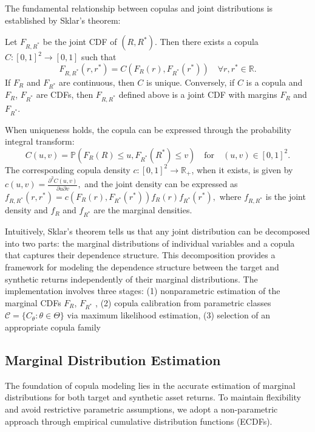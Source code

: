 The fundamental relationship between copulas and joint distributions is established by Sklar's theorem:

\begin{theorem}[Sklar (1959)]
Let $F_{R,R^*}$ be the joint CDF of $(R,R^*)$. Then there exists a copula $C: [0,1]^2 \to [0,1]$ such that
\begin{equation}
   F_{R,R^*}(r,r^*) = C(F_R(r), F_{R^*}(r^*)) \quad \forall r,r^* \in \mathbb{R}.
\end{equation}
If $F_R$ and $F_{R^*}$ are continuous, then $C$ is unique. Conversely, if $C$ is a copula and $F_R$, $F_{R^*}$ are CDFs, then $F_{R,R^*}$ defined above is a joint CDF with margins $F_R$ and $F_{R^*}$.
\end{theorem}
%
When uniqueness holds, the copula can be expressed through the probability integral transform: 
$$
C(u,v) = \mathbb P( F_R(R) \leq u, F_{R^*}(R^*) \leq v) 
\quad \text{for} \quad
(u,v)\in[0,1]^2
.
$$
The corresponding copula density $c:[0,1]^2\to\mathbb R_+$, when it exists, is given by
$
   c(u,v) = \frac{\partial^2 C(u,v)}{\partial u \partial v},
$
and the joint density can be expressed as
$
   f_{R,R^*}(r,r^*) = c(F_R(r), F_{R^*}(r^*)) f_R(r)f_{R^*}(r^*),
$
where $f_{R,R^*}$ is the joint density and $f_R$ and $f_{R^*}$ are the marginal densities.

Intuitively, Sklar's theorem tells us that any joint distribution can be decomposed into two parts: the marginal distributions of individual variables and a copula that captures their dependence structure. 
This decomposition provides a framework for modeling the dependence structure between the target and synthetic returns independently of their marginal distributions. The implementation involves three stages: (1) nonparametric estimation of the marginal CDFs $F_R$, $F_{R^*}$ , (2) copula calibration from parametric classes $\mathcal{C} = \{C_\theta : \theta \in \Theta\}$ via maximum likelihood estimation, (3) selection of an appropriate copula family 



\subsection{Marginal Distribution Estimation}
The foundation of copula modeling lies in the accurate estimation of marginal distributions for both target and synthetic asset returns. To maintain flexibility and avoid restrictive parametric assumptions, we adopt a non-parametric approach through empirical cumulative distribution functions (ECDFs).

